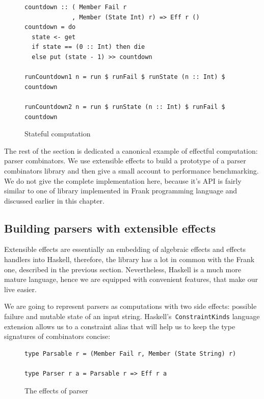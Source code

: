     \begin{figure}[h]
    \begin{lstlisting}
countdown :: ( Member Fail r
             , Member (State Int) r) => Eff r ()
countdown = do
  state <- get
  if state == (0 :: Int) then die
  else put (state - 1) >> countdown

runCountdown1 n = run $ runFail $ runState (n :: Int) $ countdown

runCountdown2 n = run $ runState (n :: Int) $ runFail $ countdown
    \end{lstlisting}
    \caption{Stateful computation}
    \label{listing:ExtEffCountdown}
    \end{figure}

    The rest of the section is dedicated a canonical example of effectful computation:
    parser combinators. We use extensible effects to build a prototype of a parser combinators
    library and then give a small account to performance benchmarking.
    We do not give the complete implementation here, because it's API is fairly
    similar to one of library implemented in Frank programming language and
    discussed earlier in this chapter.

    \subsection{Building parsers with extensible effects}

      Extensible effects are essentially an embedding of algebraic effects and effects handlers
      into Haskell, therefore, the library has a lot in common with the Frank one, described
      in the previous section. Nevertheless, Haskell is a much more mature language, hence
      we are equipped with convenient features, that make our live easier.

      We are going to represent parsers as computations with two side effects: possible failure
      and mutable state of an input string.
      Haskell's~\texttt{ConstraintKinds} language extension allows us to
      a constraint alias that will help us to keep the type signatures of combinators concise:

      \begin{figure}[h]
      \begin{lstlisting}
type Parsable r = (Member Fail r, Member (State String) r)

type Parser r a = Parsable r => Eff r a
      \end{lstlisting}
      \caption{The effects of parser}
      \label{listing:ExtEffCountdown}
      \end{figure}

